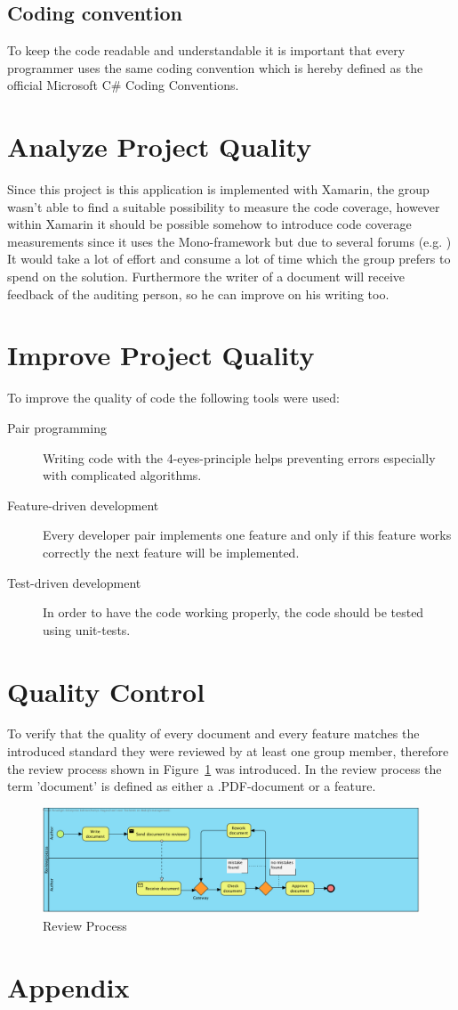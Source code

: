 \documentclass[12pt]{article}
\begin{document}
		\subsection{Coding convention}
		To keep the code readable and understandable it is important that every programmer uses the same coding convention which is hereby defined as the official Microsoft C\# Coding Conventions. \cite{Microsoft}
		
		\section{Analyze Project Quality}
		Since this project is this application is implemented with Xamarin, the group wasn't able to find a suitable possibility to measure the code coverage, however within Xamarin it should be possible somehow to introduce code coverage measurements since it uses the Mono-framework but due to several forums (e.g. \cite{CodeCoverage}) It would take a lot of effort and consume a lot of time which the group prefers to spend on the solution. Furthermore the writer of a document will receive feedback of the auditing person, so he can improve on his writing too.
		\clearpage
		\section{Improve Project Quality}
		To improve the quality of code the following tools were used:
		\begin{description}
			\item[Pair programming] Writing code with the 4-eyes-principle helps preventing errors especially with complicated algorithms.
			\item[Feature-driven development] Every developer pair implements one feature and only if this feature works correctly the next feature will be implemented.
			\item[Test-driven development] In order to have the code working properly, the code should be tested using unit-tests.
		\end{description}
		\clearpage
		\section{Quality Control}
		To verify that the quality of every document and every feature matches the introduced standard they were reviewed by at least one group member, therefore the review process shown in Figure~\ref{reviewProcess} was introduced. In the review process the term 'document' is defined as either a .PDF-document or a feature.
		\begin{figure}[htpb]
			\minipage{\textwidth}
			\includegraphics[width=\linewidth, keepaspectratio=true]{./img/CheckQuality.png}
			\caption{Review Process}\label{reviewProcess}
			\endminipage\hfill
		\end{figure}
		\clearpage

\clearpage
\section{Appendix}

\end{document}
